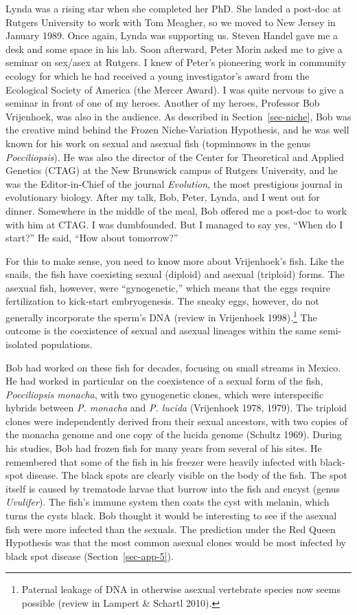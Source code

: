 \documentclass[
  letterpaper,
]{book}
\begin{document}
Lynda was a rising star when she completed her PhD. She landed a
post-doc at Rutgers University to work with Tom Meagher, so we moved to
New Jersey in January 1989. Once again, Lynda was supporting us. Steven
Handel gave me a desk and some space in his lab. Soon afterward, Peter
Morin asked me to give a seminar on sex/asex at Rutgers. I knew of
Peter's pioneering work in community ecology for which he had received a
young investigator's award from the Ecological Society of America (the
Mercer Award). I was quite nervous to give a seminar in front of one of
my heroes. Another of my heroes, Professor Bob Vrijenhoek, was also in
the audience. As described in Section~\ref{sec-niche}, Bob was the
creative mind behind the Frozen Niche-Variation Hypothesis, and he was
well known for his work on sexual and asexual fish (topminnows in the
genus \emph{Poeciliopsis}). He was also the director of the Center for
Theoretical and Applied Genetics (CTAG) at the New Brunswick campus of
Rutgers University, and he was the Editor-in-Chief of the journal
\emph{Evolution}, the most prestigious journal in evolutionary biology.
After my talk, Bob, Peter, Lynda, and I went out for dinner. Somewhere
in the middle of the meal, Bob offered me a post-doc to work with him at
CTAG. I was dumbfounded. But I managed to say yes, ``When do I start?''
He said, ``How about tomorrow?''

For this to make sense, you need to know more about Vrijenhoek's fish.
Like the snails, the fish have coexisting sexual (diploid) and asexual
(triploid) forms. The asexual fish, however, were ``gynogenetic,'' which
means that the eggs require fertilization to kick-start embryogenesis.
The sneaky eggs, however, do not generally incorporate the sperm's DNA
(review in Vrijenhoek 1998).\footnote{Paternal leakage of DNA in
  otherwise asexual vertebrate species now seems possible (review in
  Lampert \& Schartl 2010).} The outcome is the coexistence of sexual
and asexual lineages within the same semi-isolated populations.

Bob had worked on these fish for decades, focusing on small streams in
Mexico. He had worked in particular on the coexistence of a sexual form
of the fish, \emph{Poeciliopsis monacha}, with two gynogenetic clones,
which were interspecific hybrids between \emph{P. monacha} and \emph{P.
lucida} (Vrijenhoek 1978, 1979). The triploid clones were independently
derived from their sexual ancestors, with two copies of the monacha
genome and one copy of the lucida genome (Schultz 1969). During his
studies, Bob had frozen fish for many years from several of his sites.
He remembered that some of the fish in his freezer were heavily infected
with black-spot disease. The black spots are clearly visible on the body
of the fish. The spot itself is caused by trematode larvae that burrow
into the fish and encyst (genus \emph{Uvulifer}). The fish's immune
system then coats the cyst with melanin, which turns the cysts black.
Bob thought it would be interesting to see if the asexual fish were more
infected than the sexuals. The prediction under the Red Queen Hypothesis
was that the most common asexual clones would be most infected by black
spot disease (Section~\ref{sec-app-5}).
\end{document}
